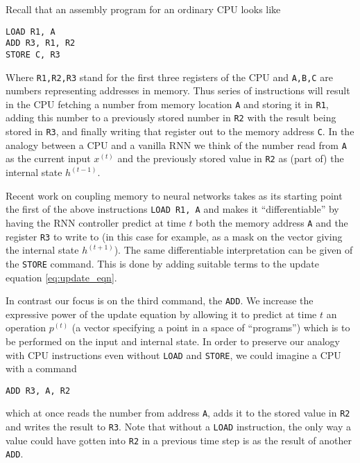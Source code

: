 \documentclass[english,letter paper,12pt,leqno]{article}
\theoremstyle{example}
\numberwithin{equation}{section}
\begin{document}
Recall that an assembly program for an ordinary CPU looks like
\begin{verbatim}
LOAD R1, A
ADD R3, R1, R2
STORE C, R3
\end{verbatim}
Where \verb+R1,R2,R3+ stand for the first three registers of the CPU and \verb+A,B,C+ are numbers representing addresses in memory. Thus series of instructions will result in the CPU fetching a number from memory location \verb+A+ and storing it in \verb+R1+, adding this number to a previously stored number in \verb+R2+ with the result being stored in \verb+R3+, and finally writing that register out to the memory address \verb+C+. In the analogy between a CPU and a vanilla RNN we think of the number read from \verb+A+ as the current input $x^{(t)}$ and the previously stored value in \verb+R2+ as (part of) the internal state $h^{(t-1)}$.

Recent work \cite{??,??} on coupling memory to neural networks takes as its starting point the first of the above instructions \verb+LOAD R1, A+ and makes it ``differentiable'' by having the RNN controller predict at time $t$ both the memory address \verb+A+ and the register \verb+R3+ to write to (in this case for example, as a mask on the vector giving the internal state $h^{(t+1)}$). The same differentiable interpretation can be given of the \verb+STORE+ command. This is done by adding suitable terms to the update equation \eqref{eq:update_eqn}.

In contrast our focus is on the third command, the \verb+ADD+. We increase the expressive power of the update equation by allowing it to predict at time $t$ an operation $p^{(t)}$ (a vector specifying a point in a space of ``programs'') which is to be performed on the input and internal state. In order to preserve our analogy with CPU instructions even without \verb+LOAD+ and \verb+STORE+, we could imagine a CPU with a command
\begin{verbatim}
ADD R3, A, R2
\end{verbatim}
which at once reads the number from address \verb+A+, adds it to the stored value in \verb+R2+ and writes the result to \verb+R3+. Note that without a \verb+LOAD+ instruction, the only way a value could have gotten into \verb+R2+ in a previous time step is as the result of another \verb+ADD+.
\end{document}
